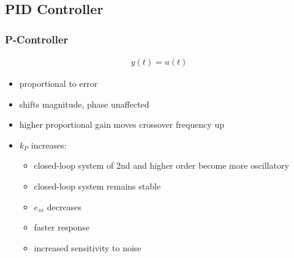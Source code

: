 \subsection{PID Controller}
    \subsubsection{P-Controller}
            \begin{align*}
                y(t) = u(t)
            \end{align*}
        \begin{itemize}
            \item proportional to error
            \item shifts magnitude, phase unaffected
            \item higher proportional gain moves crossover frequency up
            \item $k_P$ increases:
            \begin{itemize}
                \item closed-loop system of 2nd and higher order become more oscillatory
                \item closed-loop system remains stable
                \item $e_{ss}$ decreases
                \item faster response
                \item increased sensitivity to noise
            \end{itemize}
        \end{itemize}

